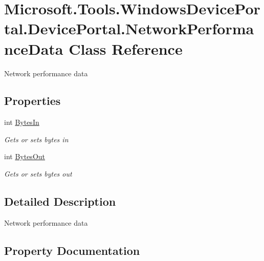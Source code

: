 \hypertarget{class_microsoft_1_1_tools_1_1_windows_device_portal_1_1_device_portal_1_1_network_performance_data}{}\section{Microsoft.\+Tools.\+Windows\+Device\+Portal.\+Device\+Portal.\+Network\+Performance\+Data Class Reference}
\label{class_microsoft_1_1_tools_1_1_windows_device_portal_1_1_device_portal_1_1_network_performance_data}


Network performance data  


\subsection*{Properties}
\begin{DoxyCompactItemize}
\item 
int \hyperlink{class_microsoft_1_1_tools_1_1_windows_device_portal_1_1_device_portal_1_1_network_performance_data_a2ce7d300110e464ec98d3252ecb3e91c}{Bytes\+In}
\begin{DoxyCompactList}\small\item\em Gets or sets bytes in \end{DoxyCompactList}\item 
int \hyperlink{class_microsoft_1_1_tools_1_1_windows_device_portal_1_1_device_portal_1_1_network_performance_data_a1d86b2d5d243e94379c9c8ac9259f624}{Bytes\+Out}
\begin{DoxyCompactList}\small\item\em Gets or sets bytes out \end{DoxyCompactList}\end{DoxyCompactItemize}


\subsection{Detailed Description}
Network performance data 



\subsection{Property Documentation}
